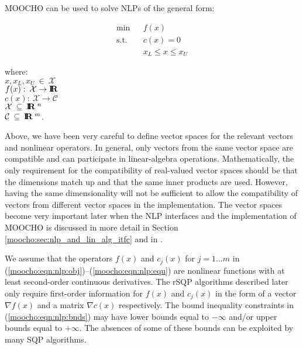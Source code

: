 \documentclass[pdf,ps2pdf,11pt]{SANDreport}
\begin{document}
MOOCHO can be used to solve NLPs of the general form: 

{\bsinglespace
\begin{eqnarray}
\mbox{min}  &  & f(x)                     \label{moocho:eqn:nlp:obj} \\
\mbox{s.t.} &  & c(x) = 0                 \label{moocho:eqn:nlp:equ} \\
            &  & x_L \leq x    \leq x_U   \label{moocho:eqn:nlp:bnds}
\end{eqnarray}
\begin{tabbing}
\hspace{4ex}where:\hspace{5ex}\= \\
\>	$x, x_L, x_U \:\in\:\mathcal{X}$ \\
\>	$f(x) : \:\mathcal{X} \rightarrow \mbox{\textbf{I}}\hspace{-0.6ex}\mbox{\textbf{R}}$ \\
\>	$c(x) : \:\mathcal{X} \rightarrow \mathcal{C}$ \\
\>	$\mathcal{X} \:\subseteq\:\mbox{\textbf{I}}\hspace{-0.6ex}\mbox{\textbf{R}}\:^n$ \\
\>	$\mathcal{C} \:\subseteq\:\mbox{\textbf{I}}\hspace{-0.6ex}\mbox{\textbf{R}}\:^m$.
\end{tabbing}
\esinglespace}

Above, we have been very careful to define vector spaces for the
relevant vectors and nonlinear operators.  In general, only vectors
from the same vector space are compatible and can participate in
linear-algebra operations.  Mathematically, the only requirement for
the compatibility of real-valued vector spaces should be that the
dimensions match up and that the same inner products are used.
However, having the same dimensionality will not be sufficient to
allow the compatibility of vectors from different vector spaces in the
implementation.  The vector spaces become very important later when
the NLP interfaces and the implementation of MOOCHO is discussed in
more detail in Section \ref{moocho:sec:nlp_and_lin_alg_itfc} and in
\cite{ref:moochodevguide}.

We assume that the operators $f(x)$ and $c_j(x)$ for $j = 1 \ldots m$
in (\ref{moocho:eqn:nlp:obj})--(\ref{moocho:eqn:nlp:equ}) are
nonlinear functions with at least second-order continuous derivatives.
The rSQP algorithms described later only require first-order
information for $f(x)$ and $c_j(x)$ in the form of a vector $\nabla
f(x)$ and a matrix $\nabla c(x)$ respectively.  The bound inequality
constraints in (\ref{moocho:eqn:nlp:bnds}) may have lower bounds equal
to $-\infty$ and/or upper bounds equal to $+\infty$.  The absences of
some of these bounds can be exploited by many SQP algorithms.
\end{document}
